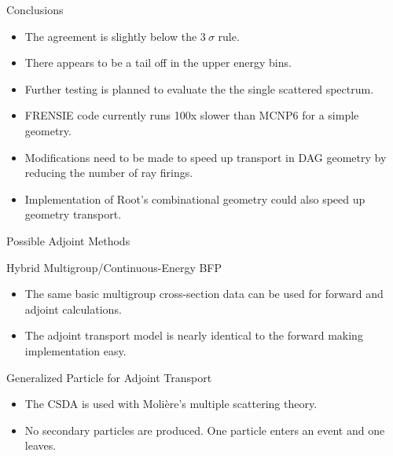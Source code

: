 \documentclass{beamer}
\begin{document}
\begin{frame}{Conclusions}
 
    \begin{itemize}
      \item The agreement is slightly below the $3~\sigma$ rule.
      
      \item There appears to be a tail off in the upper energy bins.
       
      \item Further testing is planned to evaluate the the single scattered spectrum.
  
      \item FRENSIE code currently runs 100x slower than MCNP6 for a simple geometry.
      
      \item Modifications need to be made to speed up transport in DAG geometry by reducing the number of ray firings.
      
      \item Implementation of Root's combinational geometry could also speed up geometry transport.
       
    \end{itemize}
\end{frame}

\begin{frame}{Possible Adjoint Methods}
  \begin{block}{Hybrid Multigroup/Continuous-Energy BFP}
 
    \begin{itemize}
      \item The same basic multigroup cross-section data can be used for forward and adjoint calculations. 
       
      \item The adjoint transport model is nearly identical to the forward making implementation easy.
    \end{itemize}
  \end{block}
  
  \begin{block}{Generalized Particle for Adjoint Transport}
    \begin{itemize}
        \item The CSDA is used with Moli\`{e}re's multiple scattering theory.
       
         \item No secondary particles are produced. One particle enters an event and one leaves.
    \end{itemize}
  \end{block}


\end{frame}
\end{document}
